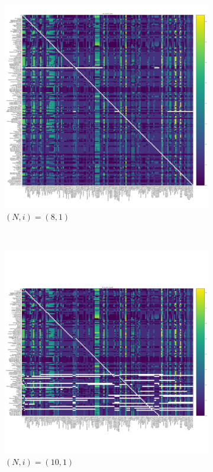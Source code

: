 \documentclass{article}
\begin{document}
\begin{figure}[!hbtp]
    \begin{subfigure}[t]{.3\textwidth}
        \centering
        \includegraphics[width=.8\textwidth]{../img/fixation_heatmap_8_1_std.pdf}
        \caption{\((N,i)=(8, 1)\)}
    \end{subfigure}%
    ~
    \begin{subfigure}[t]{.3\textwidth}
        \centering
        \includegraphics[width=.8\textwidth]{../img/fixation_heatmap_10_1_std.pdf}
        \caption{\((N,i)=(10, 1)\)}
    \end{subfigure}%
    ~
    \begin{subfigure}[t]{.3\textwidth}

\end{subfigure}
\end{figure}
\end{document}
